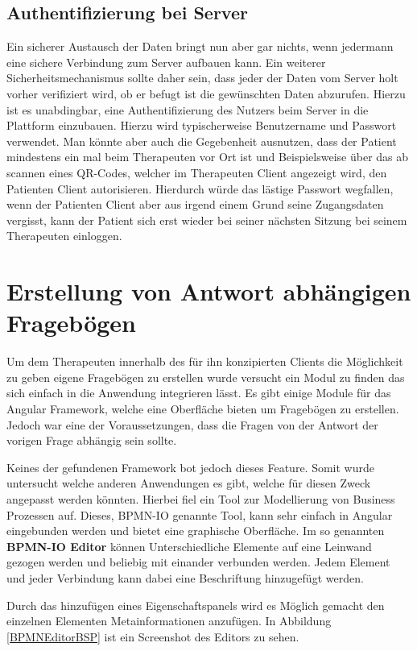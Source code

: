 \subsection{Authentifizierung bei Server}
Ein sicherer Austausch der Daten bringt nun aber gar nichts, wenn jedermann eine sichere Verbindung zum Server aufbauen kann. Ein weiterer Sicherheitsmechanismus sollte daher sein, dass jeder der Daten vom Server holt vorher verifiziert wird, ob er befugt ist die gewünschten Daten abzurufen.
Hierzu ist es unabdingbar, eine Authentifizierung des Nutzers beim Server in die Plattform einzubauen. Hierzu wird typischerweise Benutzername und Passwort verwendet. Man könnte aber auch die Gegebenheit ausnutzen, dass der Patient mindestens ein mal beim Therapeuten vor Ort ist und Beispielsweise über das ab scannen eines QR-Codes, welcher im Therapeuten Client angezeigt wird, den Patienten Client autorisieren. Hierdurch würde das lästige Passwort wegfallen, wenn der Patienten Client aber aus irgend einem Grund seine Zugangsdaten vergisst, kann der Patient sich erst wieder bei seiner nächsten Sitzung bei seinem Therapeuten einloggen.

\section{Erstellung von Antwort abhängigen Fragebögen}
Um dem Therapeuten innerhalb des für ihn konzipierten Clients die Möglichkeit zu geben eigene Fragebögen zu erstellen wurde versucht ein Modul zu finden das sich einfach in die Anwendung integrieren lässt. Es gibt einige Module für das Angular Framework, welche eine Oberfläche bieten um Fragebögen zu erstellen. Jedoch war eine der Voraussetzungen, dass die Fragen von der Antwort der vorigen Frage abhängig sein sollte.

Keines der gefundenen Framework bot jedoch dieses Feature. Somit wurde untersucht welche anderen Anwendungen es gibt, welche für diesen Zweck angepasst werden könnten. Hierbei fiel ein Tool zur Modellierung von Business Prozessen auf. Dieses, BPMN-IO \cite{BPMNIO16} genannte Tool, kann sehr einfach in Angular eingebunden werden und bietet eine graphische Oberfläche. Im so genannten \textbf{BPMN-IO Editor} können Unterschiedliche Elemente auf eine Leinwand gezogen werden und beliebig mit einander verbunden werden. Jedem Element und jeder Verbindung kann dabei eine Beschriftung hinzugefügt werden. 

Durch das hinzufügen eines Eigenschaftspanels wird es Möglich gemacht den einzelnen Elementen Metainformationen anzufügen. In Abbildung \ref{BPMNEditorBSP} ist ein Screenshot des Editors zu sehen.

